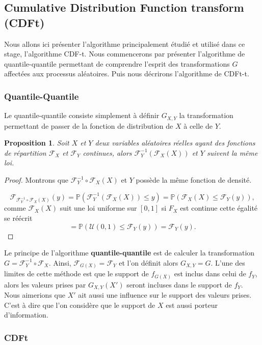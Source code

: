 \documentclass[a4paper,10pt]{article}
\newtheorem{proposition}{Proposition}
\begin{document}
\subsection{Cumulative Distribution Function transform (CDFt)}
Nous allons ici présenter l'algorithme principalement étudié et utilisé dans ce stage, l'algorithme CDF-t. Nous commencerons par présenter l'algorithme de quantile-quantile permettant de comprendre l'esprit des transformations $G$ affectées aux processus aléatoires. Puis nous décrirons l'algorithme de CDFt-t. 
 
\subsubsection{Quantile-Quantile}
\label{Q-Q}
Le quantile-quantile consiste simplement à définir $G_{X,Y}$ la transformation permettant de passer de la fonction de distribution de $X$ à celle de $Y$. 
\begin{proposition}
	Soit $X$ et $Y$ deux variables aléatoires réelles ayant des fonctions de répartition $\mathcal{F}_{X}$ et $\mathcal{F}_{Y}$ continues, alors 
	$\mathcal{F}^{-1}_Y (\mathcal{F}_X(X))$ et $Y$ suivent la même loi. 
\end{proposition}

\begin{proof}
	Montrons que $\mathcal{F}^{-1}_Y \circ \mathcal{F}_X(X)$ et $Y$ possède la même fonction de densité. 
	
	\[\mathcal{F}_{\mathcal{F}^{-1}_Y \circ \mathcal{F}_X(X)}(y)
		= \mathbb{P}(\mathcal{F}^{-1}_Y (\mathcal{F}_X(X))\leq y )
		= \mathbb{P}(\mathcal{F}_{X}(X) \leq \mathcal{F}_Y(y)),\]
	comme $\mathcal{F}_{X}(X)$ suit une loi uniforme sur $[0,1]$ si $F_X$ est continue cette égalité se réécrit
	\[= \mathbb{P}(\mathcal{U}(0,1) \leq \mathcal{F}_Y(y))=\mathcal{F}_Y(y).\]
	
	
\end{proof}
Le principe de l'algorithme \textbf{quantile-quantile} est de calculer la transformation $G=\mathcal{F}^{-1}_{Y} \circ \mathcal{F}_{X}$. Ainsi, $\mathcal{F}_{G(X)}=\mathcal{F}_{Y}$ et l'on définit alors $G_{X,Y}=G$. L'une des limites de cette méthode est que le support de $f_{G(X)}$ est inclus dans celui de $f_{Y}$, alors les valeurs prises par $G
_{X,Y}(X')$ seront incluses dans le support de $f_Y$. Nous aimerions que $X'$ ait aussi une influence sur le support des valeurs prises. C'est à dire que l'on considère que le support de $X$ est aussi porteur d'information.

\subsubsection{CDFt}
\end{document}
